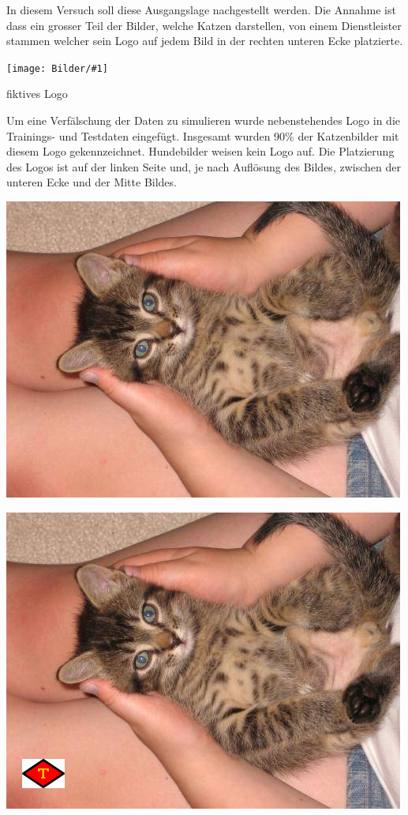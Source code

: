 \documentclass[
  12pt, %
  a4paper, %
  oneside, %
  openany, 
  numbers=noenddot, %
  BCOR=5mm, %
  parskip=half*, %
  thesis, %
]{bfhbook}
\newcommand{\imgText}[3]{
\begin{center}
    \begin{minipage}[t]{0.6\textwidth}
    		\vspace{0pt}
		\texttt{[image: Bilder/\#1]}
		\caption{#2}
	\end{minipage}\hfill
    \begin{minipage}[t]{0.4\textwidth}
    		\vspace{20pt}
  		#3
    \end{minipage}
\end{center}
}
\begin{document}
\break
In diesem Versuch soll diese Ausgangslage nachgestellt werden. Die Annahme ist dass ein grosser Teil der Bilder, welche Katzen darstellen, von einem Dienstleister stammen welcher sein Logo auf jedem Bild in der rechten unteren Ecke platzierte. 

\imgText{watermark.jpg}{fiktives Logo}{
 \vspace{20pt}
Um eine Verfälschung der Daten zu simulieren wurde nebenstehendes Logo in die Trainings- und Testdaten eingefügt. 
\break 
Insgesamt wurden 90\% der Katzenbilder mit diesem Logo gekennzeichnet. Hundebilder weisen kein Logo auf. \break Die Platzierung des Logos ist auf der linken Seite und, je nach Auflösung des Bildes, zwischen der unteren Ecke und der Mitte Bildes.
}

\begin{center}
\begin{minipage}[t]{0.45\linewidth}
	\centering
	\includegraphics[width=\textwidth]{Bilder/cat_5.jpg}
\end{minipage}\hfill
\begin{minipage}[t]{0.45\linewidth}
	\centering
	\includegraphics[width=\textwidth]{Bilder/cat_6.jpg}
\end{minipage}
\end{center}
\end{document}

